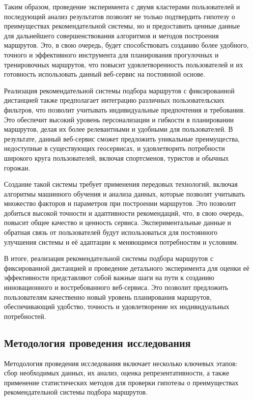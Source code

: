 Таким образом, проведение эксперимента с двумя кластерами пользователей и последующий анализ результатов позволят не только подтвердить гипотезу о преимуществах рекомендательной системы, но и предоставить ценные данные для дальнейшего совершенствования алгоритмов и методов построения маршрутов. Это, в свою очередь, будет способствовать созданию более удобного, точного и эффективного инструмента для планирования прогулочных и тренировочных маршрутов, что повысит удовлетворенность пользователей и их готовность использовать данный веб-сервис на постоянной основе.

Реализация рекомендательной системы подбора маршрутов с фиксированной дистанцией также предполагает интеграцию различных пользовательских фильтров, что позволит учитывать индивидуальные предпочтения и требования. Это обеспечит высокий уровень персонализации и гибкости в планировании маршрутов, делая их более релевантными и удобными для пользователей. В результате, данный веб-сервис сможет предложить уникальные преимущества, недоступные в существующих геосервисах, и удовлетворить потребности широкого круга пользователей, включая спортсменов, туристов и обычных горожан.

Создание такой системы требует применения передовых технологий, включая алгоритмы машинного обучения и анализа данных, которые позволят учитывать множество факторов и параметров при построении маршрутов. Это позволит добиться высокой точности и адаптивности рекомендаций, что, в свою очередь, повысит общее качество и ценность сервиса. Экспериментальные данные и обратная связь от пользователей будут использоваться для постоянного улучшения системы и её адаптации к меняющимся потребностям и условиям.

В итоге, реализация рекомендательной системы подбора маршрутов с фиксированной дистанцией и проведение детального эксперимента для оценки её эффективности представляют собой важные шаги на пути к созданию инновационного и востребованного веб-сервиса. Это позволит предложить пользователям качественно новый уровень планирования маршрутов, обеспечивающий удобство, точность и удовлетворение их индивидуальных потребностей.

\subsection{Методология проведения исследования}

Методология проведения исследования включает несколько ключевых этапов: сбор необходимых данных, их анализ, оценка репрезентативности, а также применение статистических методов для проверки гипотезы о преимуществах рекомендательной системы подбора маршрутов.

